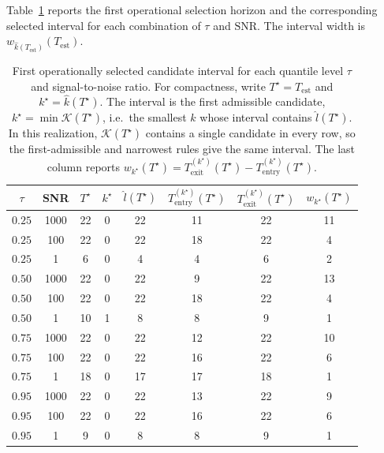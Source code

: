 \documentclass[12pt,a4paper]{article}
\begin{document}
Table~\ref{tab:simulation_est_interval} reports the first operational
selection horizon and the corresponding selected interval for each
combination of $\tau$ and $\mathrm{SNR}$. The interval width is
$w_{\widehat k(T_{\mathrm{est}})}(T_{\mathrm{est}})$.

\begin{table}[htbp]
	\centering
	\caption{First operationally selected candidate interval for each
		quantile level $\tau$ and signal-to-noise ratio. For compactness,
		write $T^\star = T_{\mathrm{est}}$ and $k^\star = \widehat k(T^\star)$.
		The interval is the first admissible candidate,
		$k^\star=\min\mathcal K(T^\star)$, i.e.\ the smallest $k$ whose
		interval contains $\widehat l(T^\star)$. In this realization,
		$\mathcal K(T^\star)$ contains a single candidate in every row, so
		the first-admissible and narrowest rules give the same interval.
		The last column reports
		$w_{k^\star}(T^\star) = T_{\mathrm{exit}}^{(k^\star)}(T^\star) -
		T_{\mathrm{entry}}^{(k^\star)}(T^\star)$.}
	\label{tab:simulation_est_interval}
	\begin{tabular}{cccccccc}
		\toprule
		$\tau$ & SNR
		& $T^\star$
		& $k^\star$
		& $\widehat l(T^\star)$
		& $T_{\mathrm{entry}}^{(k^\star)}(T^\star)$
		& $T_{\mathrm{exit}}^{(k^\star)}(T^\star)$
		& $w_{k^\star}(T^\star)$ \\
		\midrule
		$0.25$ & 1000 & 22 & 0 & 22 & 11 & 22 & 11 \\
		$0.25$ & 100  & 22 & 0 & 22 & 18 & 22 &  4 \\
		$0.25$ & 1    &  6 & 0 &  4 &  4 &  6 &  2 \\
		\midrule
		$0.50$ & 1000 & 22 & 0 & 22 &  9 & 22 & 13 \\
		$0.50$ & 100  & 22 & 0 & 22 & 18 & 22 &  4 \\
		$0.50$ & 1    & 10 & 1 &  8 &  8 &  9 &  1 \\
		\midrule
		$0.75$ & 1000 & 22 & 0 & 22 & 12 & 22 & 10 \\
		$0.75$ & 100  & 22 & 0 & 22 & 16 & 22 &  6 \\
		$0.75$ & 1    & 18 & 0 & 17 & 17 & 18 &  1 \\
		\midrule
		$0.95$ & 1000 & 22 & 0 & 22 & 13 & 22 &  9 \\
		$0.95$ & 100  & 22 & 0 & 22 & 16 & 22 &  6 \\
		$0.95$ & 1    &  9 & 0 &  8 &  8 &  9 &  1 \\
		\bottomrule
	\end{tabular}
\end{table}
\end{document}
